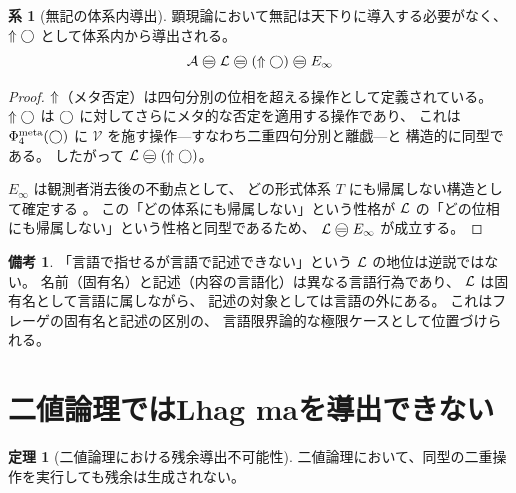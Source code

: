 \documentclass[11pt,a4paper]{article}
\theoremstyle{definition}
\newtheorem{theorem}{定理}[section]
\newtheorem{corollary}{系}[section]
\newtheorem{remark}{備考}[section]
\newcommand{\Einfty}{E_\infty}
\newcommand{\Phimeta}{\Phi_{4}^{\mathrm{meta}}}
\begin{document}
\begin{corollary}[無記の体系内導出]
顕現論において無記は天下りに導入する必要がなく、
$\Uparrow\bigcirc$ として体系内から導出される。
\begin{equation}
\Avyakata  \mweq  \Lhagma  \mweq  (\metanegation\dfix)  \mweq  \Einfty
\end{equation}
\end{corollary}

\begin{proof}
$\Uparrow$（メタ否定）は四句分別の位相を超える操作として定義されている。
$\Uparrow\bigcirc$ は $\bigcirc$ に対してさらにメタ的な否定を適用する操作であり、
これは $\Phimeta(\dfix)$ に $\mathcal{V}$ を施す操作---すなわち二重四句分別と離戯---と
構造的に同型である。
したがって $\Lhagma \mweq (\metanegation\dfix)$。

$\Einfty$ は観測者消去後の不動点として、
どの形式体系 $T$ にも帰属しない構造として確定する \cite{Chiba2026_einfty}。
この「どの体系にも帰属しない」という性格が
$\mathcal{L}$ の「どの位相にも帰属しない」という性格と同型であるため、
$\Lhagma \mweq \Einfty$ が成立する。
\end{proof}

\begin{remark}
「言語で指せるが言語で記述できない」という $\mathcal{L}$ の地位は逆説ではない。
名前（固有名）と記述（内容の言語化）は異なる言語行為であり、
$\mathcal{L}$ は固有名として言語に属しながら、
記述の対象としては言語の外にある。
これはフレーゲの固有名と記述の区別の、
言語限界論的な極限ケースとして位置づけられる。
\end{remark}

\section{二値論理ではLhag maを導出できない}

\begin{theorem}[二値論理における残余導出不可能性]
二値論理において、同型の二重操作を実行しても残余は生成されない。
\end{theorem}
\end{document}

